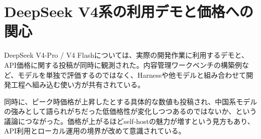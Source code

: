 \section{DeepSeek V4系の利用デモと価格への関心}

DeepSeek V4-Pro / V4 Flashについては、実際の開発作業に利用するデモと、API価格に関する投稿が同時に観測された。内容管理ワークベンチの構築例など、モデルを単独で評価するのではなく、Harnessや他モデルと組み合わせて開発工程へ組み込む使い方が共有されている。

同時に、ピーク時価格が上昇したとする具体的な数値も投稿され、中国系モデルの強みとして語られがちだった低価格性が変化しつつあるのではないか、という議論につながった。価格が上がるほどself-hostの魅力が増すという見方もあり、API利用とローカル運用の境界が改めて意識されている。
